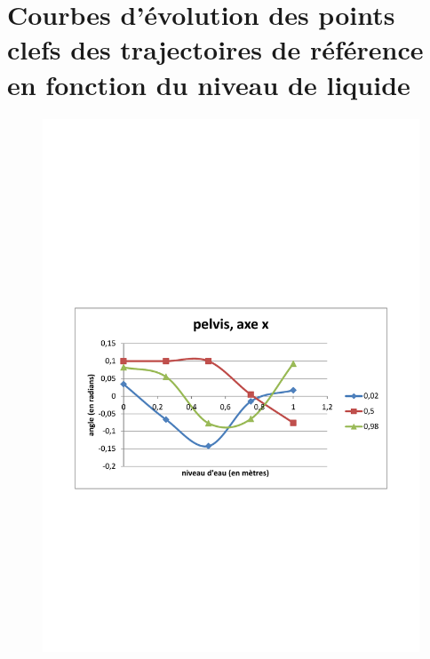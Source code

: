 \documentclass[runningheads,a4paper]{llncs}
\begin{document}
\section{Courbes d'évolution des points clefs des trajectoires de référence en fonction du niveau de liquide}
\label{sec:evo_key_points_with_wlvl}
\begin{figure}[h]
\centering
\includegraphics[scale=0.3]{traj_pts_clefs/pelvis_x.pdf}

\end{figure}
\end{document}
